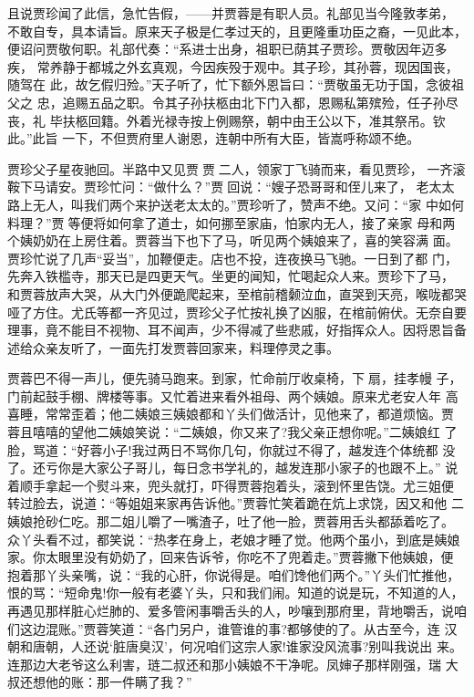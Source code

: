 且说贾珍闻了此信，急忙告假，——并贾蓉是有职人员。礼部见当今隆敦孝弟，
不敢自专，具本请旨。原来天子极是仁孝过天的，且更隆重功臣之裔，一见此本，
便诏问贾敬何职。礼部代奏：“系进士出身，祖职已荫其子贾珍。贾敬因年迈多疾，
常养静于都城之外玄真观，今因疾殁于观中。其子珍，其孙蓉，现因国丧，随驾在
此，故乞假归殓。”天子听了，忙下额外恩旨曰：“贾敬虽无功于国，念彼祖父之
忠，追赐五品之职。令其子孙扶柩由北下门入都，恩赐私第殡殓，任子孙尽丧，礼
毕扶柩回籍。外着光禄寺按上例赐祭，朝中由王公以下，准其祭吊。钦此。”此旨
一下，不但贾府里人谢恩，连朝中所有大臣，皆嵩呼称颂不绝。

贾珍父子星夜驰回。半路中又见贾贾二人，领家丁飞骑而来，看见贾珍，
一齐滚鞍下马请安。贾珍忙问：“做什么？”贾回说：“嫂子恐哥哥和侄儿来了，
老太太路上无人，叫我们两个来护送老太太的。”贾珍听了，赞声不绝。又问：“家
中如何料理？”贾等便将如何拿了道士，如何挪至家庙，怕家内无人，接了亲家
母和两个姨奶奶在上房住着。贾蓉当下也下了马，听见两个姨娘来了，喜的笑容满
面。贾珍忙说了几声“妥当”，加鞭便走。店也不投，连夜换马飞驰。一日到了都
门，先奔入铁槛寺，那天已是四更天气。坐更的闻知，忙喝起众人来。贾珍下了马，
和贾蓉放声大哭，从大门外便跪爬起来，至棺前稽颡泣血，直哭到天亮，喉咙都哭
哑了方住。尤氏等都一齐见过，贾珍父子忙按礼换了凶服，在棺前俯伏。无奈自要
理事，竟不能目不视物、耳不闻声，少不得减了些悲戚，好指挥众人。因将恩旨备
述给众亲友听了，一面先打发贾蓉回家来，料理停灵之事。

贾蓉巴不得一声儿，便先骑马跑来。到家，忙命前厅收桌椅，下扇，挂孝幔
子，门前起鼓手棚、牌楼等事。又忙着进来看外祖母、两个姨娘。原来尤老安人年
高喜睡，常常歪着；他二姨娘三姨娘都和丫头们做活计，见他来了，都道烦恼。贾
蓉且嘻嘻的望他二姨娘笑说：“二姨娘，你又来了?我父亲正想你呢。”二姨娘红
了脸，骂道：“好蓉小子!我过两日不骂你几句，你就过不得了，越发连个体统都
没了。还亏你是大家公子哥儿，每日念书学礼的，越发连那小家子的也跟不上。”
说着顺手拿起一个熨斗来，兜头就打，吓得贾蓉抱着头，滚到怀里告饶。尤三姐便
转过脸去，说道：“等姐姐来家再告诉他。”贾蓉忙笑着跪在炕上求饶，因又和他
二姨娘抢砂仁吃。那二姐儿嚼了一嘴渣子，吐了他一脸，贾蓉用舌头都舔着吃了。
众丫头看不过，都笑说：“热孝在身上，老娘才睡了觉。他两个虽小，到底是姨娘
家。你太眼里没有奶奶了，回来告诉爷，你吃不了兜着走。”贾蓉撇下他姨娘，便
抱着那丫头亲嘴，说：“我的心肝，你说得是。咱们馋他们两个。”丫头们忙推他，
恨的骂：“短命鬼!你一般有老婆丫头，只和我们闹。知道的说是玩，不知道的人，
再遇见那样脏心烂肺的、爱多管闲事嚼舌头的人，吵嚷到那府里，背地嚼舌，说咱
们这边混账。”贾蓉笑道：“各门另户，谁管谁的事?都够使的了。从古至今，连
汉朝和唐朝，人还说‘脏唐臭汉’，何况咱们这宗人家!谁家没风流事?别叫我说出
来。连那边大老爷这么利害，琏二叔还和那小姨娘不干净呢。凤婶子那样刚强，瑞
大叔还想他的账：那一件瞒了我？”

